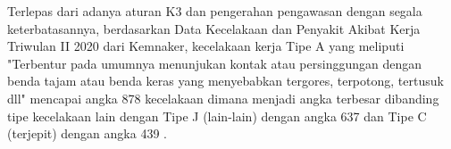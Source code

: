 \par Terlepas dari adanya aturan K3 dan pengerahan pengawasan dengan segala keterbatasannya, berdasarkan Data Kecelakaan dan Penyakit Akibat Kerja Triwulan II 2020 dari Kemnaker, kecelakaan kerja Tipe A yang meliputi "Terbentur pada umumnya menunjukan kontak atau persinggungan dengan benda tajam atau benda keras yang menyebabkan tergores, terpotong, tertusuk dll" mencapai angka 878 kecelakaan dimana menjadi angka terbesar dibanding tipe kecelakaan lain dengan Tipe J (lain-lain) dengan angka 637 dan Tipe C (terjepit) dengan angka 439 \cite{satudata_kecelakaan_kerja}.